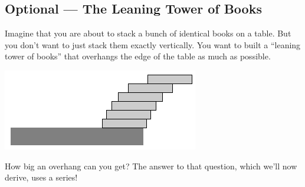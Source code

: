 \subsection{Optional --- The Leaning Tower of Books}\label{sec:Stack}
Imagine that you are about to stack a bunch of identical books on a
table. But you don't want to just stack them exactly vertically.
You want to built a ``leaning tower of books'' that overhangs the
edge of the table as much as possible.
\begin{efig}
\begin{center}
     \includegraphics{bookStack.pdf}
\end{center}
\end{efig}
How big an overhang can you get? The answer to that question, which we'll now
derive, uses a series!
